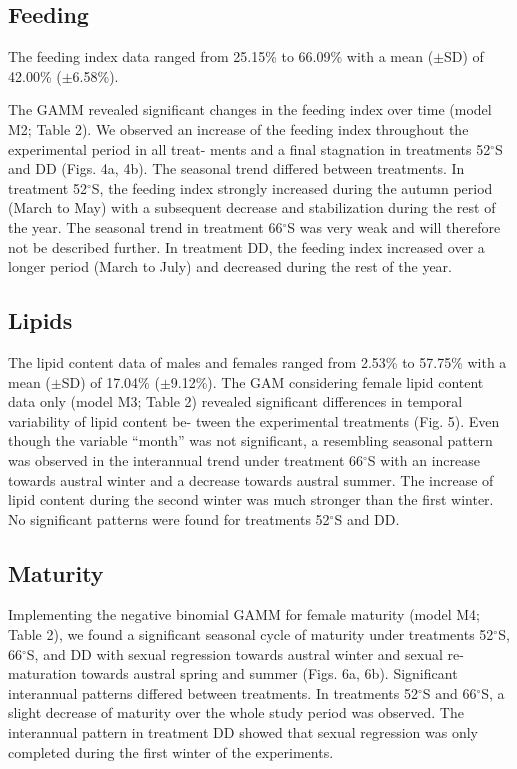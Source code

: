 \subsection{Feeding}

The feeding index data ranged from 25.15\% to 66.09\% with a mean ($\pm$SD) of
42.00\% ($\pm$6.58\%). 

The GAMM revealed significant changes in the feeding index over time (model M2;
Table 2). We observed an increase of the feeding index throughout the
experimental period in all treat- ments and a final stagnation in treatments
52$^{\circ}$S and DD (Figs. 4a, 4b). The seasonal trend differed between
treatments. In treatment 52$^{\circ}$S, the feeding index strongly increased
during the autumn period (March to May) with a subsequent decrease and
stabilization during the rest of the year. The seasonal trend in treatment
66$^{\circ}$S was very weak and will therefore not be described further. In
treatment DD, the feeding index increased over a longer period (March to July)
and decreased during the rest of the year.

\subsection{Lipids}

The lipid content data of males and females ranged from 2.53\% to 57.75\% with
a mean ($\pm$SD) of 17.04\% ($\pm$9.12\%). The GAM considering female lipid
content data only (model M3; Table 2) revealed significant differences in
temporal variability of lipid content be- tween the experimental treatments
(Fig. 5). Even though the variable “month” was not significant, a resembling
seasonal pattern was observed in the interannual trend under treatment
66$^{\circ}$S with an increase towards austral winter and a decrease towards
austral summer. The increase of lipid content during the second winter was much
stronger than the first winter. No significant patterns were found for
treatments 52$^{\circ}$S and DD.

\subsection{Maturity}

Implementing the negative binomial GAMM for female maturity (model M4; Table
2), we found a significant seasonal cycle of maturity under treatments
52$^{\circ}$S, 66$^{\circ}$S, and DD with sexual regression towards austral
winter and sexual re-maturation towards austral spring and summer (Figs. 6a,
6b). Significant interannual patterns differed between treatments. In
treatments 52$^{\circ}$S and 66$^{\circ}$S, a slight decrease of maturity over
the whole study period was observed. The interannual pattern in treatment DD
showed that sexual regression was only completed during the first winter of the
experiments. 

